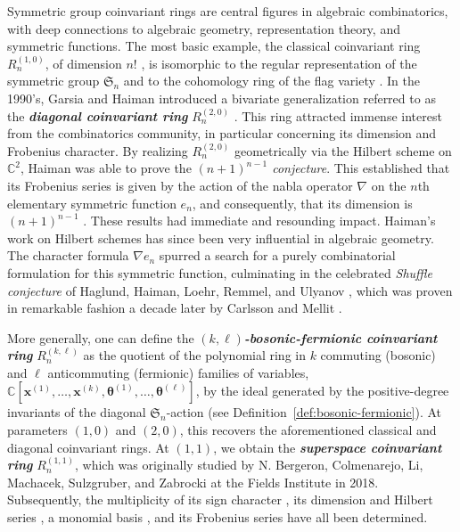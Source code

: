 \documentclass[11pt, noadjust, reqno]{amsart}
\theoremstyle{definition}
\theoremstyle{remark}
\numberwithin{equation}{section}
\newcommand{\0}{\emptyset}
\newcommand{\C}{\mathbb{C}}
\newcommand{\newword}[1]{\emph{\textbf{#1}}}
\begin{document}
Symmetric group coinvariant rings are central figures in algebraic combinatorics, with deep connections to algebraic geometry, representation theory, and symmetric functions. 
The most basic example, the classical coinvariant ring $R_n^{(1,0)}$, of dimension $n!$  \cite{Artin}, is isomorphic to the regular representation of the symmetric group $\mathfrak{S}_n$ \cite{Chevalley} and to the cohomology ring of the flag variety \cite{Borel, Leray}. 
In the 1990's, Garsia and Haiman introduced a bivariate generalization referred to as the \newword{diagonal coinvariant ring} $R_n^{(2,0)}$ \cite{Haiman1994}. 
This ring attracted immense interest from the combinatorics community, in particular concerning its dimension and Frobenius character. 
By realizing $R_n^{(2,0)}$ geometrically via the Hilbert scheme on $\C^2$, Haiman was able to prove the \emph{$(n+1)^{n-1}$ conjecture}.
This established that its Frobenius series is given by the action of the nabla operator $\nabla$ on the $n$th elementary symmetric function $e_n$, and consequently, that its dimension is $(n+1)^{n-1}$ \cite{Haiman2002}.
These results had immediate and resounding impact. 
Haiman's work on Hilbert schemes has since been very influential in algebraic geometry.
The character formula $\nabla e_n$ spurred a search for a purely combinatorial formulation for this symmetric function, culminating in the celebrated \emph{Shuffle conjecture} of Haglund, Haiman, Loehr, Remmel, and Ulyanov \cite{HHLRU2005}, which was proven in remarkable fashion a decade later by Carlsson and Mellit \cite{CarlssonMellit2018}.

More generally, one can define the \newword{$(k,\ell)$-bosonic-fermionic coinvariant ring} $R_n^{(k,\ell)}$ as the quotient of the polynomial ring in $k$ commuting (bosonic) and $\ell$ anticommuting (fermionic) families of variables,
$\C[\bm{x}^{(1)}, \ldots, \bm{x}^{(k)}, \bm{\theta}^{(1)}, \ldots, \bm{\theta}^{(\ell)}]$, by the ideal generated by the positive-degree invariants of the diagonal $\mathfrak{S}_n$-action (see Definition~\ref{def:bosonic-fermionic}). 
At parameters $(1,0)$ and $(2,0)$, this recovers the aforementioned classical and diagonal coinvariant rings. 
At $(1,1)$, we obtain the \newword{superspace coinvariant ring} $R_n^{(1,1)}$, which was originally studied by N. Bergeron, Colmenarejo, Li, Machacek, Sulzgruber, and Zabrocki at the Fields Institute in 2018. 
Subsequently, the multiplicity of its sign character \cite{SwansonWallach1}, its dimension and Hilbert series \cite{RhoadesWilson2023}, a monomial basis \cite{SaganSwanson2024, Angarone2024}, and its Frobenius series \cite{MuraiRhoadesWilson} have all been determined. 
\end{document}
